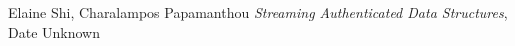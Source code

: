 \documentclass[11pt, letterpaper, oneside]{article}
\begin{document}

\begin{thebibliography}{9}
	 Elaine Shi, Charalampos Papamanthou \emph{Streaming Authenticated Data Structures}, Date Unknown
	\end{thebibliography}
\end{document}
